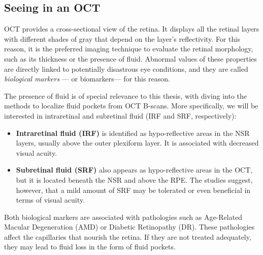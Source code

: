 \subsection{Seeing in an OCT}
OCT provides a cross-sectional view of the retina. It displays all the retinal layers with different shades of gray that depend on the layer's reflectivity. For this reason, it is the preferred imaging technique to evaluate the retinal morphology, such as its thickness or the presence of fluid. Abnormal values of these properties are directly linked to potentially disastrous eye conditions, and they are called \textit{biological markers} --- or biomarkers--- for this reason. 

The presence of fluid is of special relevance to this thesis, with  diving into the methods to localize fluid pockets from OCT B-scans. More specifically, we will be interested in intraretinal and subretinal fluid (IRF and SRF, respectively):
\begin{itemize}
    \item \textbf{Intraretinal fluid (IRF)} is identified as hypo-reflective areas in the NSR layers, usually above the outer plexiform layer. It is associated with decreased visual acuity.

    \item \textbf{Subretinal fluid (SRF)} also appears as hypo-reflective areas in the OCT, but it is located beneath the NSR and above the RPE. The studies suggest, however, that a mild amount of SRF may be tolerated or even beneficial in terms of visual acuity.  
\end{itemize}

Both biological markers are associated with pathologies such as Age-Related Macular Degeneration (AMD) or Diabetic Retinopathy (DR). These pathologies affect the capillaries that nourish the retina. If they are not treated adequately, they may lead to fluid loss in the form of fluid pockets.


